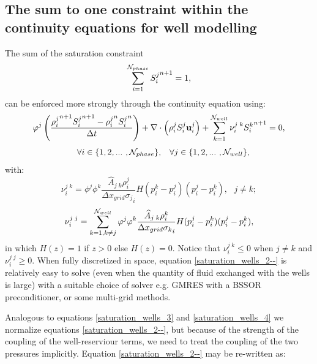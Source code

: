\subsection{The sum to one constraint within the continuity equations for well modelling}
\label{Continuity equation for well modelling}
The sum of the saturation constraint
\begin{equation}
\sum\limits_{i=1}^{{\cal N}_{phase}}
{S_i^{j}}^{n+1}
= 1,
\label{saturation_wells_3c--}
\end{equation}
can be enforced more strongly through the continuity equation using:
\begin{equation}
\phi^j \displaystyle \left( \frac{
 {\rho_{i}^{j}}^{n+1} {S_i^{j}}^{n+1} - {\rho_{i}^{j}}^n {S_i^{j}}^n
}{\Delta t} \right) + \nabla\cdot\left(\rho_{i}^{j}S_i^{j}\mathbf{u}_i^{j}\right) + \sum_{k=1}^{{\cal N}_{well}} \nu_{i}^{j\;k}  {S_i^{k}}^{n+1}= 0,
\label{saturation_wells_2--}
\end{equation}
\begin{equation}
~~~ \forall i \in\{ 1,2,...~ , {\cal N}_{phase}\}, \;\;\;
\forall j \in\{ 1,2,...~ , {\cal N}_{well} \},
\label{saturation_wells_2--all}
\end{equation}
with:
\begin{equation}
\nu_{i}^{j\;k} = \phi^j \phi^k \frac{ \widehat A_{j\;k}  \rho_i^{j}  }{{{\Delta x}_{grid}\sigma_{j}}_i}  H(p_{i}^{k}-p_{i}^{j}) (p_{i}^{j}-p_{i}^{k}),
~~~j\neq k ;
\label{saturation_wells_H1}
\end{equation}
\begin{equation}
\nu_{i}^{j\;j} = \sum_{k=1, k\neq j}^{{\cal N}_{well}} \phi^j \phi^k \frac{ \widehat A_{j\;k}  \rho_i^{k}  }{{{\Delta x}_{grid}\sigma_{k}}_i} H(p_{i}^{j}-p_{i}^{k}) (p_{i}^{j}-p_{i}^{k}),
\label{saturation_wells_H2}
\end{equation}
in which $H(z)=1$ if $z>0$ else $H(z)=0$.
Notice that $\nu_{i}^{j\;k}\le 0$ when $j\neq k$ and $\nu_{i}^{j\;j}\ge 0$.
When fully discretized in space, equation \ref{saturation_wells_2--} is relatively easy to solve (even when the quantity
of fluid exchanged with the wells is large) with a suitable choice of solver e.g. GMRES with a
BSSOR preconditioner, or some multi-grid methods.

Analogous to equations \ref{saturation_wells_3} and \ref{saturation_wells_4} we normalize equations
\ref{saturation_wells_2--},
but because of the strength of the coupling of the well-reserviour terms, we need to
treat the coupling of the two pressures implicitly. Equation \ref{saturation_wells_2--} may be re-written
as:

